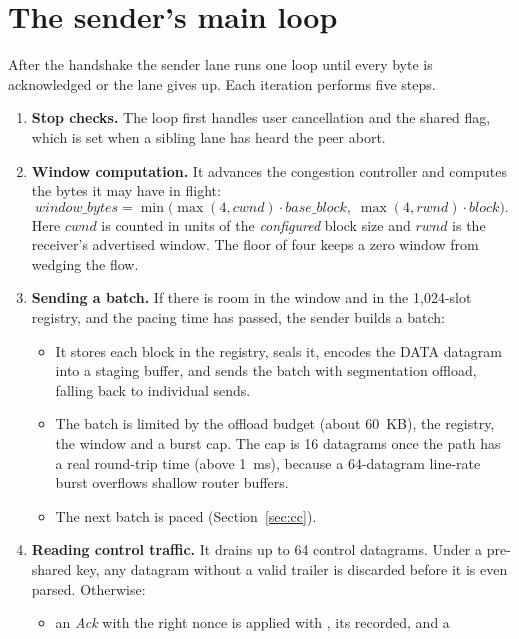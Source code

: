 \section{The sender's main loop}\label{sec:sendloop}

After the handshake the sender lane runs one loop until every byte is acknowledged or the lane gives up. Each
iteration performs five steps.

\begin{enumerate}
  \item \textbf{Stop checks.} The loop first handles user cancellation and the shared  flag, which
    is set when a sibling lane has heard the peer abort.
  \item \textbf{Window computation.} It advances the congestion controller and computes the bytes it may have in
    flight:
    \[
    \mathit{window\_bytes}=\min\bigl(\max(4,\mathit{cwnd})\cdot\mathit{base\_block},\;\max(4,\mathit{rwnd})\cdot\mathit{block}\bigr).
    \]
    Here $\mathit{cwnd}$ is counted in units of the \emph{configured} block size\vviii{} and $\mathit{rwnd}$ is
    the receiver's advertised window\vviii. The floor of four keeps a zero window from wedging the flow.
  \item \textbf{Sending a batch.} If there is room in the window and in the 1,024-slot registry, and the pacing
    time has passed, the sender builds a batch:
    \begin{itemize}
      \item It stores each block in the registry, seals it, encodes the DATA datagram into a staging buffer, and
        sends the batch with segmentation offload, falling back to individual sends.
      \item The batch is limited by the offload budget (about 60~KB), the registry, the window and a burst cap.
        The cap is 16 datagrams once the path has a real round-trip time (above 1~ms), because a 64-datagram
        line-rate burst overflows shallow router buffers.
      \item The next batch is paced (Section~\ref{sec:cc}).
    \end{itemize}
  \item \textbf{Reading control traffic.} It drains up to 64 control datagrams. Under a pre-shared key, any
    datagram without a valid trailer is discarded before it is even parsed. Otherwise:
    \begin{itemize}
      \item an \emph{Ack} with the right nonce is applied with , its  recorded, and a

\end{itemize}
\end{enumerate}
